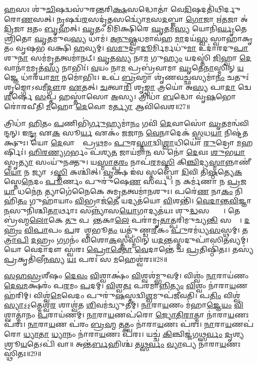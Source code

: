 \ul{𑌹}\ul{}𑌸𑌃 𑌶𑍁॑\ul{𑌚𑌿}𑌷𑌦𑍍𑌵𑌸𑍁॑𑌰𑌨𑍍𑌤𑌰𑌿\ul{𑌕𑍍𑌷}𑌸𑌦𑍍𑌧𑍋𑌤𑌾॑ 𑌵𑍇\ul{𑌦𑌿}𑌷𑌦𑌤𑌿॑𑌥𑌿𑌰𑍍𑌦𑍁𑌰𑍋\ul{𑌣}𑌸𑌤𑍍। 
\ul{𑌨𑍃}𑌷𑌦𑍍𑌵॑\ul{𑌰}𑌸𑌦𑍃॑\ul{𑌤}𑌸𑌦𑍍𑌵𑍍𑌯𑍋॑\ul{𑌮}𑌸\ul{𑌦}𑌬𑍍𑌜𑌾 \ul{𑌗𑍋}𑌜𑌾 𑌋॑\ul{𑌤}𑌜𑌾 𑌅॑\ul{𑌦𑍍𑌰𑌿}𑌜𑌾 \ul{𑌋}𑌤𑌂 \ul{𑌬𑍃}𑌹𑌤𑍍। 
\ul{𑌘𑍃}𑌤𑌂 𑌮𑌿॑𑌮𑌿𑌕𑍍𑌷𑌿𑌰𑍇 \ul{𑌘𑍃}𑌤𑌮॑\ul{𑌸𑍍𑌯} 𑌯𑍋𑌨𑌿॑\ul{𑌰𑍍𑌘𑍃}𑌤𑍇 \ul{𑌶𑍍𑌰𑌿}𑌤𑍋 \ul{𑌘𑍃}𑌤𑌮𑍁॑𑌵\ul{𑌸𑍍𑌯} 𑌧𑌾𑌮॑। 
\ul{𑌅}\ul{𑌨𑍁}\ul{𑌷𑍍𑌵}𑌧𑌮𑌾𑌵॑𑌹 \ul{𑌮𑌾}𑌦𑌯॑\ul{𑌸𑍍𑌵} 𑌸𑍍𑌵𑌾𑌹𑌾॑𑌕𑍃𑌤𑌂 𑌵𑍃𑌷𑌭 𑌵𑌕𑍍𑌷𑌿 \ul{𑌹}𑌵𑍍𑌯𑌮𑍍। 
\ul{𑌸}\ul{𑌮𑍁}𑌦𑍍𑌰𑌾\ul{𑌦𑍂}𑌰𑍍𑌮𑌿𑌰𑍍𑌮𑌧𑍁॑\ul{𑌮𑌾}\ul{} 𑌉𑌦𑌾॑𑌰𑌦𑍁\ul{𑌪𑌾}\ul{}𑌶𑍁\ul{𑌨𑌾} 𑌸𑌮॑𑌮𑍃\ul{𑌤}𑌤𑍍𑌵𑌮𑌾॑𑌨𑌟𑍍। 
\ul{𑌘𑍃}𑌤\ul{𑌸𑍍𑌯} 𑌨𑌾\ul{𑌮} 𑌗𑍁\ul{𑌹𑍍𑌯𑌂} 𑌯𑌦𑌸𑍍𑌤𑌿॑ \ul{𑌜𑌿}𑌹𑍍𑌵𑌾 \ul{𑌦𑍇}𑌵𑌾𑌨𑌾॑\ul{𑌮}𑌮𑍃𑌤॑\ul{𑌸𑍍𑌯} 𑌨𑌾𑌭𑌿𑌃॑। 
\ul{𑌵}𑌯𑌂 𑌨𑌾\ul{𑌮} 𑌪𑍍𑌰𑌬𑍍𑌰॑𑌵𑌾𑌮𑌾 \ul{𑌘𑍃}𑌤𑍇\ul{𑌨𑌾}𑌸𑍍𑌮𑌿𑌨𑍍 \ul{𑌯}𑌜𑍍𑌞𑍇 𑌧𑌾॑𑌰𑌯𑌾\ul{𑌮𑌾} 𑌨𑌮𑍋॑𑌭𑌿𑌃। 
𑌉𑌪॑ \ul{𑌬𑍍𑌰}𑌹𑍍𑌮𑌾 𑌶𑍃॑𑌣𑌵\ul{𑌚𑍍𑌛}𑌸𑍍𑌯𑌮𑌾॑\ul{𑌨𑌂} 𑌚𑌤𑍁𑌃॑ 𑌶𑍃𑌙𑍍𑌗𑍋𑌽𑌵𑌮𑍀\ul{𑌦𑍍𑌗𑍗}𑌰 \ul{𑌏}𑌤𑌤𑍍। 
\ul{𑌚}𑌤𑍍𑌵𑌾\ul{𑌰𑌿} 𑌶𑍃\ul{𑌙𑍍𑌗𑌾} 𑌤𑍍𑌰𑌯𑍋॑ 𑌅\ul{𑌸𑍍𑌯} 𑌪𑌾\ul{𑌦𑌾} 𑌦𑍍𑌵𑍇 \ul{𑌶𑍀}𑌰𑍍\mbox{}𑌷𑍇 \ul{𑌸}𑌪𑍍𑌤 𑌹𑌸𑍍𑌤𑌾॑𑌸𑍋 \ul{𑌅}𑌸𑍍𑌯। 
𑌤𑍍𑌰𑌿𑌧𑌾॑ \ul{𑌬}𑌦𑍍𑌧𑍋 𑌵𑍃॑\ul{𑌷}𑌭𑍋 𑌰𑍋॑𑌰𑌵𑍀𑌤𑌿 \ul{𑌮}𑌹𑍋 \ul{𑌦𑍇}𑌵𑍋 𑌮\ul{𑌰𑍍𑌤𑍍𑌯𑌾}\ul{} 𑌆𑌵𑌿॑𑌵𑍇𑌶॥27॥

𑌤𑍍𑌰𑌿𑌧𑌾॑ \ul{𑌹𑌿}𑌤𑌂 \ul{𑌪}𑌣𑌿𑌭𑌿॑\ul{𑌰𑍍𑌗𑍁}𑌹𑍍𑌯𑌮𑌾॑\ul{𑌨𑌂} 𑌗𑌵𑌿॑ \ul{𑌦𑍇}𑌵𑌾𑌸𑍋॑ \ul{𑌘𑍃}𑌤𑌮𑌨𑍍𑌵॑𑌵𑌿𑌨𑍍𑌦𑌨𑍍। 
𑌇\ul{𑌨𑍍𑌦𑍍𑌰} 𑌏\ul{𑌕}\ul{} 𑌸𑍂\ul{𑌰𑍍𑌯} 𑌏𑌕𑌂॑ 𑌜𑌜𑌾𑌨 \ul{𑌵𑍇}𑌨𑌾𑌦𑍇𑌕॑ \ul{𑌸𑍍𑌵}𑌧\ul{𑌯𑌾} 𑌨𑌿𑌷𑍍𑌟॑𑌤𑌕𑍍𑌷𑍁𑌃। 
𑌯𑍋 \ul{𑌦𑍇}𑌵𑌾𑌨𑌾𑌂᳚ 𑌪𑍍𑌰\ul{𑌥}𑌮𑌂 \ul{𑌪𑍁}𑌰\ul{𑌸𑍍𑌤𑌾}𑌦𑍍𑌵𑌿\ul{𑌶𑍍𑌵𑌾}𑌧𑌿𑌯𑍋॑ \ul{𑌰𑍁}𑌦𑍍𑌰𑍋 \ul{𑌮}𑌹𑌰𑍍\mbox{}𑌷𑌿𑌃॑। 
\ul{𑌹𑌿}\ul{𑌰}\ul{𑌣𑍍𑌯}\ul{𑌗}𑌰𑍍𑌭𑌂 𑌪॑𑌶𑍍𑌯\ul{𑌤} 𑌜𑌾𑌯॑𑌮𑌾\ul{𑌨}\ul{} 𑌸 𑌨𑍋॑ \ul{𑌦𑍇}𑌵𑌃 \ul{𑌶𑍁}𑌭\ul{𑌯𑌾} 𑌸𑍍𑌮𑍃\ul{𑌤𑍍𑌯𑌾} 𑌸𑌂𑌯𑍁॑𑌨𑌕𑍍𑌤𑍁। 
𑌯\ul{𑌸𑍍𑌮𑌾}𑌤𑍍𑌪\ul{𑌰𑌂} 𑌨𑌾𑌪॑\ul{𑌰}𑌮\ul{𑌸𑍍𑌤𑌿} 𑌕𑌿\ul{𑌞𑍍𑌚𑌿}𑌦𑍍𑌯\ul{𑌸𑍍𑌮𑌾}𑌨𑍍𑌨𑌾𑌣𑍀॑\ul{𑌯𑍋} 𑌨 𑌜𑍍𑌯𑌾𑌯𑍋᳚𑌽\ul{𑌸𑍍𑌤𑌿} 𑌕𑌶𑍍𑌚𑌿॑𑌤𑍍। 
\ul{𑌵𑍃}𑌕𑍍𑌷 𑌇॑𑌵 𑌸𑍍𑌤𑌬𑍍𑌧𑍋 \ul{𑌦𑌿}𑌵𑌿 𑌤𑌿॑\ul{𑌷𑍍𑌠}𑌤𑍍𑌯𑍇\ul{𑌕}𑌸𑍍𑌤𑍇\ul{𑌨𑍇}𑌦𑌂 \ul{𑌪𑍂}𑌰𑍍𑌣𑌂 𑌪𑍁𑌰𑍁॑𑌷𑍇\ul{𑌣} 𑌸𑌰𑍍𑌵𑌮𑍍᳚। 
𑌨 𑌕𑌰𑍍𑌮॑𑌣𑌾 𑌨 \ul{𑌪𑍍𑌰}𑌜\ul{𑌯𑌾} 𑌧𑌨𑍇॑\ul{𑌨} 𑌤𑍍𑌯𑌾𑌗𑍇॑𑌨𑍈𑌕𑍇 𑌅𑌮𑍃\ul{𑌤}𑌤𑍍𑌵𑌮𑌾॑\ul{𑌨}𑌶𑍁𑌃। 
𑌪𑌰𑍇॑\ul{𑌣} 𑌨𑌾\ul{𑌕𑌂} 𑌨𑌿𑌹𑌿॑\ul{𑌤𑌂} 𑌗𑍁𑌹𑌾॑𑌯𑌾𑌂 \ul{𑌵𑌿}𑌭𑍍𑌰𑌾𑌜॑\ul{𑌤𑍇} 𑌯𑌦𑍍𑌯𑌤॑𑌯𑍋 \ul{𑌵𑌿}𑌶𑌨𑍍𑌤𑌿॑। 
\ul{𑌵𑍇}\ul{𑌦𑌾}\ul{𑌨𑍍𑌤}\ul{𑌵𑌿}𑌜𑍍𑌞𑌾\ul{𑌨}𑌸𑍁𑌨𑌿॑𑌶𑍍𑌚𑌿\ul{𑌤𑌾}𑌰𑍍𑌥𑌾𑌃 𑌸𑌨𑍍𑌨𑍍𑌯𑌾॑𑌸\ul{𑌯𑍋}𑌗𑌾𑌦𑍍𑌯𑌤॑𑌯𑌃 𑌶𑍁\ul{𑌦𑍍𑌧}𑌸𑌤𑍍𑌤𑍍𑌵𑌾𑌃᳚। 
𑌤𑍇 𑌬𑍍𑌰॑𑌹𑍍𑌮\ul{𑌲𑍋}𑌕𑍇 \ul{𑌤𑍁} 𑌪𑌰𑌾᳚𑌨𑍍𑌤𑌕𑌾\ul{𑌲𑍇} 𑌪𑌰𑌾॑𑌮𑍃\ul{𑌤𑌾}𑌤𑍍𑌪𑌰𑌿॑𑌮𑍁𑌚𑍍𑌯\ul{𑌨𑍍𑌤𑌿} 𑌸𑌰𑍍𑌵𑍇᳚। 
\ul{𑌦}\ul{𑌹𑍍𑌰𑌂} \ul{𑌵𑌿}\ul{𑌪𑌾}𑌪𑌂 \ul{𑌪}𑌰𑌮𑍇᳚𑌶𑍍𑌮𑌭𑍂\ul{𑌤𑌂} 𑌯𑌤𑍍𑌪𑍁॑𑌣𑍍𑌡\ul{𑌰𑍀}𑌕𑌂 \ul{𑌪𑍁}𑌰𑌮॑𑌧𑍍𑌯\ul{𑌸}\ul{}𑌸𑍍𑌥𑌮𑍍। 
\ul{𑌤}\ul{𑌤𑍍𑌰𑌾}\ul{𑌪𑌿} \ul{𑌦}𑌹𑍍𑌰𑌂 \ul{𑌗}𑌗𑌨𑌂॑ 𑌵𑌿𑌶𑍋\ul{𑌕}𑌸𑍍𑌤𑌸𑍍𑌮𑌿॑𑌨𑍍 𑌯\ul{𑌦}𑌨𑍍𑌤𑌸𑍍𑌤𑌦𑍁𑌪𑌾॑𑌸𑌿\ul{𑌤}𑌵𑍍𑌯𑌮𑍍। 
𑌯𑍋 𑌵𑍇𑌦𑌾𑌦𑍗 𑌸𑍍𑌵॑𑌰𑌃 \ul{𑌪𑍍𑌰𑍋}\ul{𑌕𑍍𑌤𑍋} \ul{𑌵𑍇}𑌦𑌾𑌨𑍍𑌤𑍇॑ 𑌚 \ul{𑌪𑍍𑌰}𑌤𑌿𑌷𑍍𑌠𑌿॑𑌤𑌃। 
𑌤𑌸𑍍𑌯॑ \ul{𑌪𑍍𑌰}𑌕𑍃𑌤𑌿॑𑌲𑍀\ul{𑌨}\ul{𑌸𑍍𑌯} \ul{𑌯𑌃} 𑌪𑌰𑌃॑ 𑌸 \ul{𑌮}𑌹𑍇𑌶𑍍𑌵॑𑌰𑌃॥28॥
\anuvakamend

\ul{𑌸}\ul{𑌹}\ul{𑌸𑍍𑌰}𑌶𑍀\sr{}𑌷𑌂 \ul{𑌦𑍇}\ul{𑌵𑌂} \ul{𑌵𑌿}𑌶𑍍𑌵𑌾𑌕𑍍𑌷𑌂॑ \ul{𑌵𑌿}𑌶𑍍𑌵𑌶॑𑌮𑍍𑌭𑍁𑌵𑌮𑍍। 
𑌵𑌿𑌶𑍍𑌵𑌂॑ \ul{𑌨𑌾}𑌰𑌾𑌯॑𑌣𑌂 \ul{𑌦𑍇}\ul{𑌵}\ul{𑌮}𑌕𑍍𑌷𑌰𑌂॑ 𑌪\ul{𑌰}𑌮𑌂 \ul{𑌪}𑌦𑌮𑍍। 
\ul{𑌵𑌿}𑌶𑍍𑌵\ul{𑌤𑌃} 𑌪𑌰॑𑌮𑌾\ul{𑌨𑍍𑌨𑌿}\ul{𑌤𑍍𑌯𑌂} \ul{𑌵𑌿}𑌶𑍍𑌵𑌂 𑌨𑌾॑𑌰𑌾\ul{𑌯}𑌣 𑌹॑𑌰𑌿𑌮𑍍। 
𑌵𑌿𑌶𑍍𑌵॑\ul{𑌮𑍇}𑌵𑍇𑌦𑌂 𑌪𑍁𑌰𑍁॑\ul{𑌷}𑌸𑍍𑌤𑌦𑍍𑌵𑌿\ul{𑌶𑍍𑌵}𑌮𑍁𑌪॑𑌜𑍀𑌵𑌤𑌿। 
𑌪\ul{𑌤𑌿𑌂} 𑌵𑌿𑌶𑍍𑌵॑\ul{𑌸𑍍𑌯𑌾}𑌽॒𑌽॒𑌤𑍍𑌮𑍇𑌶𑍍𑌵॑\ul{𑌰}\ul{} 𑌶𑌾𑌶𑍍𑌵॑𑌤 \ul{𑌶𑌿}𑌵𑌮॑𑌚𑍍𑌯𑍁𑌤𑌮𑍍। 
\ul{𑌨𑌾}𑌰𑌾\ul{𑌯}𑌣𑌂 𑌮॑𑌹𑌾\ul{𑌜𑍍𑌞𑍇}\ul{𑌯𑌂} \ul{𑌵𑌿}𑌶𑍍𑌵𑌾𑌤𑍍𑌮𑌾॑𑌨𑌂 \ul{𑌪}𑌰𑌾𑌯॑𑌣𑌮𑍍। 
\ul{𑌨𑌾}𑌰𑌾\ul{𑌯}𑌣𑌪॑𑌰𑍋 \ul{𑌜𑍍𑌯𑍋}\ul{𑌤𑌿}\ul{𑌰𑌾}𑌤𑍍𑌮𑌾 𑌨𑌾॑𑌰𑌾\ul{𑌯}𑌣𑌃 𑌪॑𑌰𑌃। 
\ul{𑌨𑌾}𑌰𑌾\ul{𑌯}𑌣 𑌪॑𑌰𑌂 \ul{𑌬𑍍𑌰}\ul{𑌹𑍍𑌮} \ul{𑌤}𑌤𑍍𑌤𑍍𑌵𑌂 𑌨𑌾॑𑌰𑌾\ul{𑌯}𑌣𑌃 𑌪॑𑌰𑌃। 
\ul{𑌨𑌾}𑌰𑌾\ul{𑌯}𑌣𑌪॑𑌰𑍋 \ul{𑌧𑍍𑌯𑌾}\ul{𑌤𑌾} \ul{𑌧𑍍𑌯𑌾}𑌨𑌂 𑌨𑌾॑𑌰𑌾\ul{𑌯}𑌣𑌃 𑌪॑𑌰𑌃। 
𑌯𑌚𑍍𑌚॑ \ul{𑌕𑌿}𑌞𑍍𑌚𑌿𑌜𑍍𑌜॑𑌗\ul{𑌥𑍍𑌸}\ul{𑌰𑍍𑌵𑌂} \ul{𑌦𑍃}𑌶𑍍𑌯𑌤𑍇᳚ 𑌶𑍍𑌰𑍂\ul{𑌯}𑌤𑍇𑌽𑌪𑌿॑ 𑌵𑌾॥ 
𑌅𑌨𑍍𑌤॑\ul{𑌰𑍍𑌬}𑌹𑌿𑌶𑍍𑌚॑ 𑌤\ul{𑌥𑍍𑌸}\ul{𑌰𑍍𑌵𑌂} \ul{𑌵𑍍𑌯𑌾}𑌪𑍍𑌯 𑌨𑌾॑𑌰𑌾\ul{𑌯}𑌣𑌃 𑌸𑍍𑌥𑌿॑𑌤𑌃॥29॥

